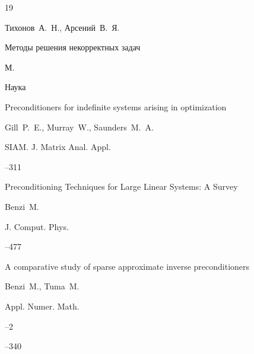 \begin{thebibliography}{19}




\by Тихонов~А.~Н., Арсений~В.~Я.

\book Методы решения некорректных задач

\publaddr М.

\publ Наука








\paper Preconditioners for indefinite systems arising in optimization

\by Gill~P.~E., Murray~W., Saunders~M.~A.

\jour SIAM. J. Matrix Anal. Appl.




--311





\paper Preconditioning Techniques for Large Linear Systems: A Survey

\by Benzi~M.

\jour J. Comput. Phys.




–477





\paper A comparative study of sparse approximate inverse preconditioners

\by Benzi~M., Tuma~M.

\jour Appl. Numer. Math.



--2

--340





\end{thebibliography}
